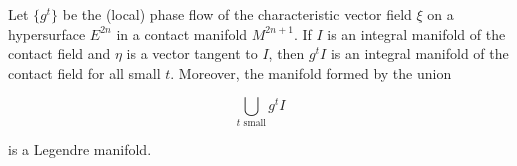 Let $\{g^t\}$ be the (local) phase flow of the characteristic vector field $\xi$ on a hypersurface $E^{2n}$ in a contact manifold $M^{2n+1}$. If $I$ is an integral manifold of the contact field and $\eta$ is a vector tangent to $I$, then $g^t I$ is an integral manifold of the contact field for all small $t$. Moreover, the manifold formed by the union

$$\bigcup_{t \text{ small}} g^t I$$

is a Legendre manifold.
